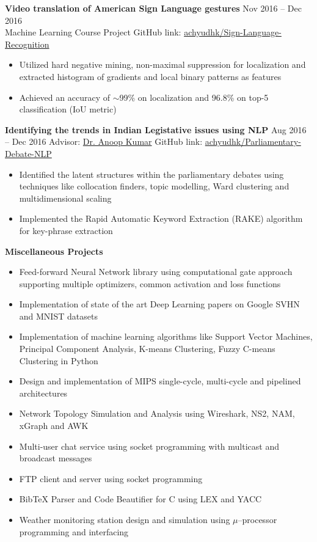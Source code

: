 \documentclass[10pt]{article}
\newenvironment{innerlist}[1][\enskip\textbullet]%
        {\begin{itemize}[#1,leftmargin=*,parsep=0pt,itemsep=0pt,topsep=0pt,partopsep=0pt]}
        {\end{itemize}}
\newcommand{\halfblankline}{\quad\vspace{-0.5\baselineskip}\pagebreak[3]}
\begin{document}
\halfblankline

\textbf{Video translation of American Sign Language gestures} \hfill {Nov 2016 -- Dec 2016}\\
Machine Learning Course Project \hfill GitHub link: \href{https://github.com/achyudhk/Sign-Language-Recognition}{achyudhk/Sign-Language-Recognition}
\vspace{0.5mm}
\begin{innerlist}
\item Utilized hard negative mining, non-maximal suppression for localization and extracted histogram of gradients and local binary patterns as features
\item Achieved an accuracy of $\sim$99\% on localization and 96.8\% on top-5 classification (IoU metric)
\end{innerlist}

\halfblankline

\textbf{Identifying the trends in Indian Legistative issues using NLP} \hfill {Aug 2016 -- Dec 2016}
Advisor: \href{http://universe.bits-pilani.ac.in/goa/anoopk/Profile}{Dr. Anoop Kumar} \hfill GitHub link: \href{https://github.com/achyudhk/Parliamentary-Debate-NLP}{achyudhk/Parliamentary-Debate-NLP}
\vspace{0.5mm}
\begin{innerlist}
\item Identified the latent structures within the parliamentary debates using techniques like collocation finders, topic modelling, Ward clustering and multidimensional scaling
\item Implemented the Rapid Automatic Keyword Extraction (RAKE) algorithm for key-phrase extraction
\end{innerlist}

\halfblankline

\textbf{Miscellaneous Projects}
\begin{innerlist}
\item Feed-forward Neural Network library using computational gate approach supporting multiple optimizers, common activation and loss functions
\item Implementation of state of the art Deep Learning papers on Google SVHN and MNIST datasets 
\item Implementation of machine learning algorithms like Support Vector Machines, Principal Component Analysis, K-means Clustering, Fuzzy C-means Clustering in Python
\item Design and implementation of MIPS single-cycle, multi-cycle and pipelined architectures
\item Network Topology Simulation and Analysis using Wireshark, NS2, NAM, xGraph and AWK
\item Multi-user chat service using socket programming with multicast and broadcast messages
\item FTP client and server using socket programming
\item BibTeX Parser and Code Beautifier for C using LEX and YACC
\item Weather monitoring station design and simulation using $\mu$--processor programming and interfacing
\end{innerlist}
\end{document}
